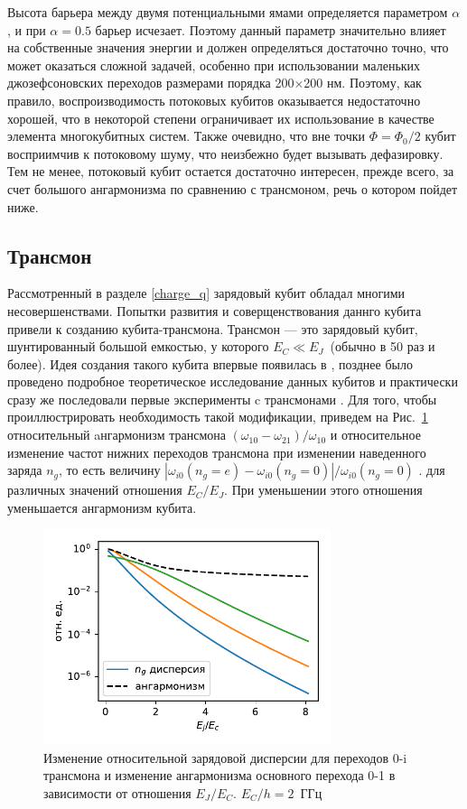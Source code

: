 Высота барьера между двумя потенциальными ямами определяется параметром $\alpha$, и при $\alpha=0.5$ барьер исчезает. Поэтому данный параметр значительно влияет на собственные значения энергии и должен определяться достаточно точно, что может оказаться сложной задачей, особенно при использовании маленьких джозефсоновских переходов размерами порядка 200$\times$200 нм. Поэтому, как правило, воспроизводимость потоковых кубитов оказывается недостаточно хорошей, что в некоторой степени ограничивает их использование в качестве элемента многокубитных систем. Также очевидно, что вне точки $\Phi=\Phi_0/2$ кубит восприимчив к потоковому шуму, что неизбежно будет вызывать дефазировку. Тем не менее, потоковый кубит остается достаточно интересен, прежде всего, за счет большого ангармонизма по сравнению с трансмоном, речь о котором пойдет ниже.  
\subsection{Трансмон} Рассмотренный в разделе \ref{charge_q} зарядовый кубит обладал многими несовершенствами. Попытки развития и соверщенствования даннго кубита привели к созданию кубита-трансмона. Трансмон --- это зарядовый кубит, шунтированный большой емкостью, у которого $E_C \ll E_J$~(обычно в 50 раз и более). Идея создания такого кубита впервые появилась в \cite{cottet2002implementation}, позднее было проведено подробное теоретическое исследование данных кубитов \cite{koch2007charge} и практически сразу же последовали первые эксперименты c трансмонами \cite{transmon}. Для того, чтобы проиллюстрировать необходимость такой модификации, приведем на Рис.~\ref{img: disp_vs_anh} относительный  aнгармонизм трансмона $(\omega_{10}-\omega_{21})/\omega_{10}$ и относительное изменение частот нижних переходов трансмона при изменении наведенного заряда $n_g$, то есть величину $|\omega_{i0}(n_g=e)-\omega_{i0}(n_g=0)|/\omega_{i0}(n_g=0)$ .  для различных значений отношения $E_C/E_J$. При уменьшении этого отношения уменьшается ангармонизм кубита.
\begin{figure}[h]\center
	\includegraphics[width=0.75\textwidth]{images/disp_vs_anh.pdf}
	\caption{Изменение относительной зарядовой дисперсии для переходов 0-i трансмона и изменение ангармонизма основного перехода 0-1 в зависимости от отношения $E_J/E_C$. $E_C/h = 2$~ГГц}
	\label{img: disp_vs_anh}
\end{figure}
